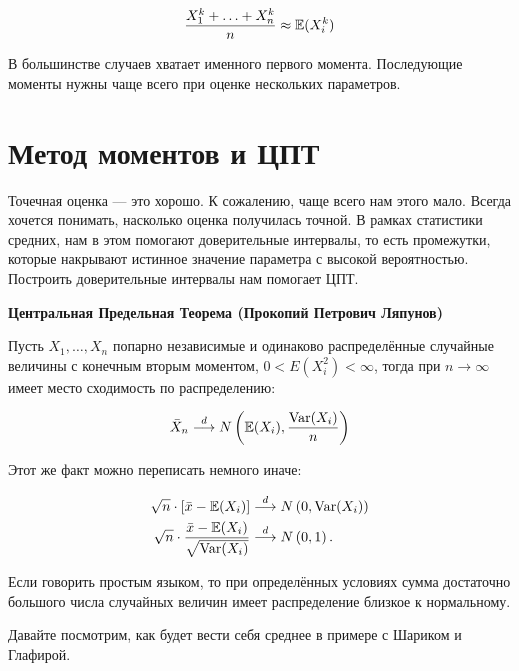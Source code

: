 \documentclass[12pt, a4paper, oneside]{article}
\begin{document}
\[ \frac{X_{1}^{k} + \ldots + X_{n}^{k}}{n} \approx \mathbb{E}(X_{i}^{k})\]

В большинстве случаев хватает именного первого момента. Последующие моменты нужны чаще всего при оценке нескольких параметров.


\section{Метод моментов и ЦПТ}

Точечная оценка --- это хорошо. К сожалению, чаще всего нам этого мало. Всегда хочется понимать, насколько оценка получилась точной. В рамках статистики средних, нам в этом помогают доверительные интервалы, то есть промежутки, которые накрывают истинное значение параметра с высокой вероятностью. Построить доверительные интервалы нам помогает ЦПТ.

\begin{theorem}{\textbf{Центральная Предельная Теорема (Прокопий Петрович Ляпунов)}}

Пусть $X_1, \ldots, X_n$ попарно независимые и одинаково распределённые случайные величины с конечным вторым моментом, $0 < E(X_i^2) < \infty$, тогда при $n \to \infty$ имеет место сходимость по распределению: 

$$
\bar{X}_n \stackrel{d}{\longrightarrow} N \left(\mathbb{E}(X_i), \frac{\operatorname{Var}(X_i)}{n} \right)
$$

Этот же факт можно переписать немного иначе:

\begin{equation*}
\begin{aligned} 
\sqrt{n} \cdot [\bar{x} - \mathbb{E}(X_i)]  &\stackrel{d}{\longrightarrow} N \left(0, \operatorname{Var}(X_i)\right)\\
\sqrt{n} \cdot \frac{\bar{x} - \mathbb{E}(X_i)}{\sqrt{\operatorname{Var}(X_i)}}  &\stackrel{d}{\longrightarrow} N \left(0, 1\right).
\end{aligned} 
\end{equation*} 
\end{theorem}

Если говорить простым языком, то при определённых условиях сумма достаточно большого числа случайных величин имеет распределение близкое к нормальному. 

Давайте посмотрим, как будет вести себя среднее в примере с Шариком и Глафирой.
\end{document}
